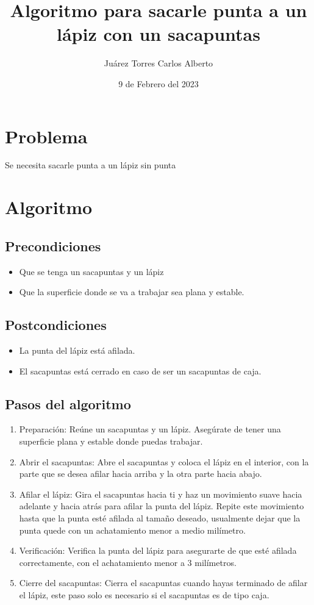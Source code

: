 \documentclass{article}
\title{Algoritmo para sacarle punta a un lápiz con un sacapuntas}
\author{Juárez Torres Carlos Alberto}
\date{9 de Febrero del 2023}
\begin{document}
\maketitle

\section*{Problema}
Se necesita sacarle punta a un lápiz sin punta
\section*{Algoritmo}
\subsection*{Precondiciones}
\begin{itemize}
    \item Que se tenga un sacapuntas y un lápiz
    \item Que la superficie donde se va a trabajar sea plana y estable.
\end{itemize}
\subsection*{Postcondiciones}
\begin{itemize}
    \item La punta del lápiz está afilada.
    \item El sacapuntas está cerrado en caso de ser un sacapuntas de caja.
\end{itemize}

\subsection*{Pasos del algoritmo}
\begin{enumerate}
    \item   Preparación: Reúne un sacapuntas y un lápiz. Asegúrate de tener una superficie plana y estable donde puedas trabajar.
    \item   Abrir el sacapuntas: Abre el sacapuntas y coloca el lápiz en el interior, con la parte que se desea afilar hacia arriba y la otra parte hacia abajo.
    \item   Afilar el lápiz: Gira el sacapuntas hacia ti y haz un movimiento suave hacia adelante y hacia atrás para afilar la punta del lápiz. Repite este movimiento hasta que la punta esté afilada al tamaño deseado, usualmente dejar que la punta quede con un achatamiento menor a medio milímetro.
    \item   Verificación: Verifica la punta del lápiz para asegurarte de que esté afilada correctamente, con el achatamiento menor a 3 milímetros.
    \item   Cierre del sacapuntas: Cierra el sacapuntas cuando hayas terminado de afilar el lápiz, este paso solo es necesario si el sacapuntas es de tipo caja.
\end{enumerate}
\end{document}
